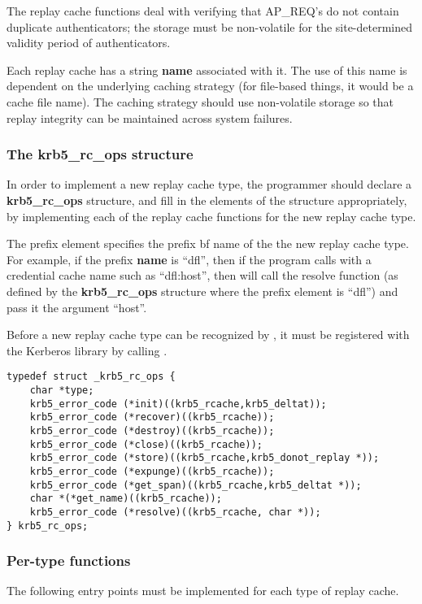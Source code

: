 The replay cache functions deal with verifying that AP_REQ's do not
contain duplicate authenticators; the storage must be non-volatile for
the site-determined validity period of authenticators.

Each replay cache has a string {\bf name} associated with it.  The use of
this name is dependent on the underlying caching strategy (for
file-based things, it would be a cache file name).  The
caching strategy should use non-volatile storage so that replay
integrity can be maintained across system failures.

\subsubsection{The krb5_rc_ops structure}
In order to implement a new replay cache type, the programmer should
declare a {\bf krb5_rc_ops} structure, and fill in the elements of the
structure appropriately, by implementing each of the replay cache
functions for the new replay cache type.  

The prefix element specifies the prefix {bf name} of the the new replay
cache type.  For example, if the prefix {\bf name} is ``dfl'', then if the
program calls  with a credential cache name
such as ``dfl:host'', then 
will call the resolve function (as defined by the {\bf krb5_rc_ops}
structure where the prefix element is ``dfl'') and pass it the
argument ``host''.

Before a new replay cache type can be recognized by
, it must be registered with the Kerberos
library by calling .

\begin{verbatim}
typedef struct _krb5_rc_ops {
    char *type;
    krb5_error_code (*init)((krb5_rcache,krb5_deltat));
    krb5_error_code (*recover)((krb5_rcache));
    krb5_error_code (*destroy)((krb5_rcache));
    krb5_error_code (*close)((krb5_rcache));
    krb5_error_code (*store)((krb5_rcache,krb5_donot_replay *));
    krb5_error_code (*expunge)((krb5_rcache));
    krb5_error_code (*get_span)((krb5_rcache,krb5_deltat *));
    char *(*get_name)((krb5_rcache));
    krb5_error_code (*resolve)((krb5_rcache, char *));
} krb5_rc_ops;
\end{verbatim}


\subsubsection{Per-type functions}
The following entry points must be implemented for each type of
replay cache.

